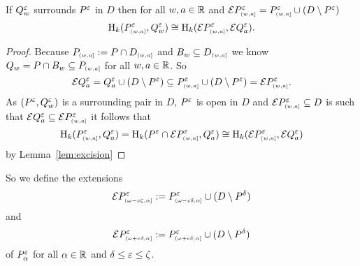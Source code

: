 \begin{lemma}\label{lem:extension_apply}
  If $Q_w^\e$ surrounds $P^\e$ in $D$ then for all $w,a\in\R$ and $\ext{P\subi{w,a}^\e} = P\subi{w,a}^\e \cup (D\setminus P^\e)$
  \[\hom_k(P\subi{w,a}^\e, Q_w^\e)\cong \hom_k(\ext{P\subi{w,a}^\e}, \ext{Q^\e_a}).\]
\end{lemma}
\begin{proof}
  Because $P\subi{w,a} := P\cap D\subi{w,a}$ and $B_w\subseteq D\subi{w,a}$ we know $Q_w = P\cap B_w \subseteq P\subi{w,a}$ for all $w,a\in\R$.
  So
  \[\ext{Q^\e_a} = Q^\e_a\cup (D\setminus P^\e) \subseteq P\subi{w,a}^\e \cup (D\setminus P^\e) = \ext{P\subi{w,a}^\e}.\]
  As $(P^\e, Q_w^\e)$ is a surrounding pair in $D$, $P^\e$ is open in $D$ and $\ext{P\subi{w,a}^\e}\subseteq D$ is such that $\ext{Q^\e_a}\subseteq \ext{P\subi{w,a}^\e}$ it follows that
  \[\hom_k(P\subi{w,a}^\e, Q^\e_a) = \hom_k(P^\e\cap \ext{P\subi{w,a}^\e}, Q^\e_a) \cong\hom_k(\ext{P\subi{w,a}^\e}, \ext{Q^\e_a})\]
  by Lemma~\ref{lem:excision}
\end{proof}

So we define the extensions
\[\ext{P^\e\subi{\omega-c\zeta, \alpha}} := P^\e\subi{\omega-c\delta, \alpha}\cup (D\setminus P^\of)\]
and
\[\ext{P^\e\subi{\omega+c\delta, \alpha}} := P^\e\subi{\omega+c\delta, \alpha}\cup (D\setminus P^\of)\]
of $P^\e_\alpha$ for all $\alpha\in\R$ and $\delta\leq\e\leq\zeta$.

